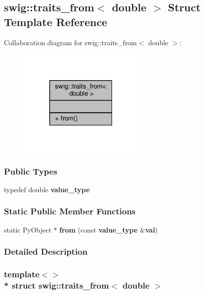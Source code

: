 \subsection{swig\+:\+:traits\+\_\+from$<$ double $>$ Struct Template Reference}
\label{structswig_1_1traits__from_3_01double_01_4}


Collaboration diagram for swig\+:\+:traits\+\_\+from$<$ double $>$\+:
\nopagebreak
\begin{figure}[H]
\begin{center}
\leavevmode
\includegraphics[width=175pt]{d7/dc5/structswig_1_1traits__from_3_01double_01_4__coll__graph}
\end{center}
\end{figure}
\subsubsection*{Public Types}
\begin{DoxyCompactItemize}
\item 
typedef double {\bf value\+\_\+type}
\end{DoxyCompactItemize}
\subsubsection*{Static Public Member Functions}
\begin{DoxyCompactItemize}
\item 
static Py\+Object $\ast$ {\bf from} (const {\bf value\+\_\+type} \&{\bf val})
\end{DoxyCompactItemize}


\subsubsection{Detailed Description}
\subsubsection*{template$<$$>$\\*
struct swig\+::traits\+\_\+from$<$ double $>$}



